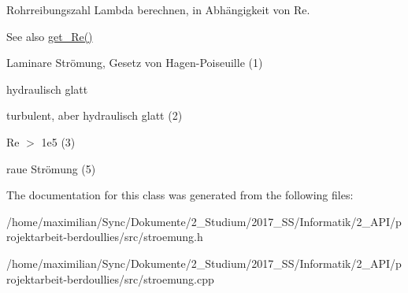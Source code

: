 Rohrreibungszahl Lambda berechnen, in Abhängigkeit von Re. 

\begin{DoxySeeAlso}{See also}
\hyperlink{class_rohrstroemung_aa491056aa77acac305aca0fde9c3e8bc}{get\+\_\+\+Re()} 
\end{DoxySeeAlso}
Laminare Strömung, Gesetz von Hagen-\/\+Poiseuille (1)

hydraulisch glatt

turbulent, aber hydraulisch glatt (2)

Re $>$ 1e5 (3)

raue Strömung (5) 

The documentation for this class was generated from the following files\+:\begin{DoxyCompactItemize}
\item 
/home/maximilian/\+Sync/\+Dokumente/2\+\_\+\+Studium/2017\+\_\+\+S\+S/\+Informatik/2\+\_\+\+A\+P\+I/projektarbeit-\/berdoullies/src/stroemung.\+h\item 
/home/maximilian/\+Sync/\+Dokumente/2\+\_\+\+Studium/2017\+\_\+\+S\+S/\+Informatik/2\+\_\+\+A\+P\+I/projektarbeit-\/berdoullies/src/stroemung.\+cpp\end{DoxyCompactItemize}
